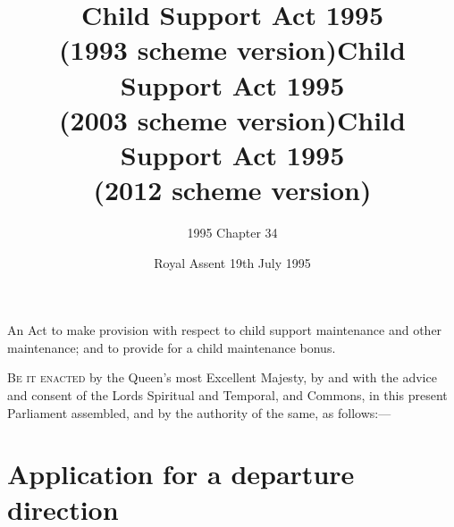 \documentclass[a4paper]{article}
\title{Child Support Act 1995\\(1993 scheme version)}
\title{Child Support Act 1995\\(2003 scheme version)}
\title{Child Support Act 1995\\(2012 scheme version)}
\author{1995 Chapter 34}
\date{Royal Assent 19th July 1995}
\begin{document}
\maketitle

\noindent
{\large An Act to make provision with respect to child support maintenance and other maintenance; and to provide for a child maintenance bonus.}

\bigskip

\lettrine{B}{e it enacted} by the Queen’s most Excellent Majesty, by and with the advice and consent of the Lords Spiritual and Temporal, and Commons, in this present Parliament assembled, and by the authority of the same, as follows:—

{\sloppy

\tableofcontents

}

\setcounter{secnumdepth}{-2}

\section{Application for a departure direction}
\end{document}
